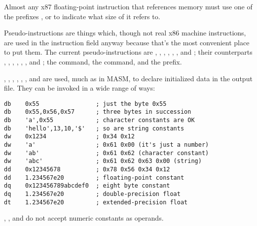 Almost any x87 floating-point instruction that references memory must
use one of the prefixes ,  or
 to indicate what size of 
it refers to.


Pseudo-instructions are things which, though not real x86 machine
instructions, are used in the instruction field anyway because that's
the most convenient place to put them. The current pseudo-instructions
are , , , ,
, ,  and ;
their  counterparts ,
, , ,
, ,  and
; the  command, the 
command, and the  prefix.


, , , ,
, ,  and 
are used, much as in MASM, to declare initialized data in
the output file. They can be invoked in a wide range of ways:

\begin{lstlisting}
db    0x55                ; just the byte 0x55
db    0x55,0x56,0x57      ; three bytes in succession
db    'a',0x55            ; character constants are OK
db    'hello',13,10,'$'   ; so are string constants
dw    0x1234              ; 0x34 0x12
dw    'a'                 ; 0x61 0x00 (it's just a number)
dw    'ab'                ; 0x61 0x62 (character constant)
dw    'abc'               ; 0x61 0x62 0x63 0x00 (string)
dd    0x12345678          ; 0x78 0x56 0x34 0x12
dd    1.234567e20         ; floating-point constant
dq    0x123456789abcdef0  ; eight byte constant
dq    1.234567e20         ; double-precision float
dt    1.234567e20         ; extended-precision float
\end{lstlisting}

, ,  and  do not accept
numeric constants as operands.


